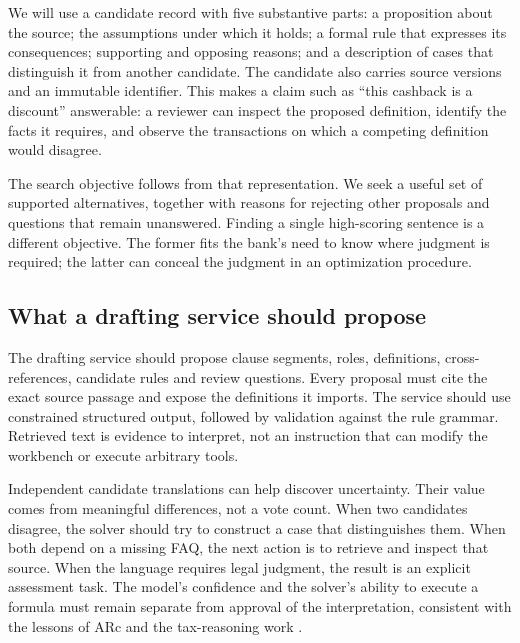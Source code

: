 
We will use a candidate record with five substantive parts: a proposition about
the source; the assumptions under which it holds; a formal rule that expresses
its consequences; supporting and opposing reasons; and a description of cases
that distinguish it from another candidate. The candidate also carries source
versions and an immutable identifier. This makes a claim such as ``this cashback
is a discount'' answerable: a reviewer can inspect the proposed definition,
identify the facts it requires, and observe the transactions on which a competing
definition would disagree.

The search objective follows from that representation. We seek a useful set of
supported alternatives, together with reasons for rejecting other proposals and
questions that remain unanswered. Finding a single high-scoring sentence is a
different objective. The former fits the bank's need to know where judgment is
required; the latter can conceal the judgment in an optimization procedure.

\subsection{What a drafting service should propose}
\label{merge:P-03-product:08}


The drafting service should propose clause segments, roles, definitions,
cross-references, candidate rules and review questions. Every proposal must cite
the exact source passage and expose the definitions it imports. The service
should use constrained structured output, followed by validation against the
rule grammar. Retrieved text is evidence to interpret, not an instruction that
can modify the workbench or execute arbitrary tools.

Independent candidate translations can help discover uncertainty. Their value
comes from meaningful differences, not a vote count. When two candidates disagree,
the solver should try to construct a case that distinguishes them. When both
depend on a missing FAQ, the next action is to retrieve and inspect that source.
When the language requires legal judgment, the result is an explicit assessment
task. The model's confidence and the solver's ability to execute a formula must
remain separate from approval of the interpretation, consistent with the lessons
of ARc and the tax-reasoning work \citep{arc2025,jurayj2026}.

